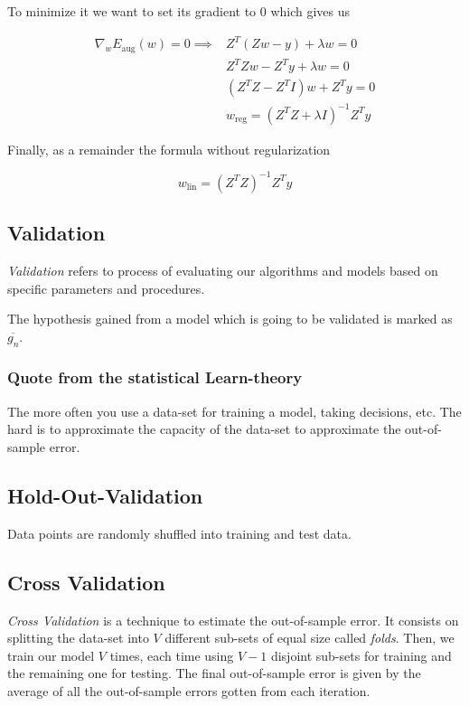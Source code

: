 To minimize it we want to set its gradient to 0 which gives us  

\begin{align*}
    \nabla_w E_{\text{aug}}(w) = 0 \implies & Z^T(Zw - y) + \lambda w = 0 \\
    & Z^TZw - Z^Ty + \lambda w = 0 \\
    & (Z^TZ - Z^T I)w + Z^T y= 0 \\
    & w_{\text{reg}} = (Z^T Z + \lambda I)^{-1} Z^T y 
\end{align*}

Finally, as a remainder the formula without regularization

\[
    w_{\text{lin}} = (Z^T Z)^{-1} Z^T y
\]

\subsection{Validation}

\emph{Validation} refers to process of evaluating our algorithms and models based on specific parameters 
and procedures. 

The hypothesis gained from a model which is going to be validated is marked as \(\overline{g_n}\). 

\subsubsection{Quote from the statistical Learn-theory}

The more often you use a data-set for training a model, taking decisions, etc. The hard is to approximate 
the capacity of the data-set to approximate the out-of-sample error. 

\subsection{Hold-Out-Validation}

Data points are randomly shuffled into training and test data. 

\subsection{Cross Validation}

\emph{Cross Validation} is a technique to estimate the out-of-sample error. It consists on splitting the data-set into \(V\) different
sub-sets of equal size called \emph{folds}. Then, we train our model \(V\) times, each time using \(V-1\) disjoint sub-sets for training and the remaining one for testing. The final 
out-of-sample error is given by the average of all the out-of-sample errors gotten from each iteration.

